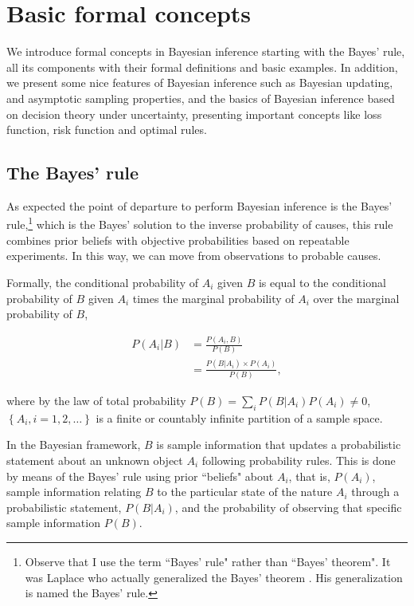 \chapter{Basic formal concepts}\label{chap1}

We introduce formal concepts in Bayesian inference starting with the Bayes’ rule, all its components with their formal definitions and basic examples. In addition, we present some nice features of Bayesian inference such as Bayesian updating, and asymptotic sampling properties, and the basics of Bayesian inference based on decision theory under uncertainty, presenting important concepts like loss function, risk function and optimal rules.

\section{The Bayes' rule}\label{sec11}
As expected the point of departure to perform Bayesian inference is the Bayes' rule,\footnote{Observe that I use the term ``Bayes' rule" rather than ``Bayes' theorem". It was Laplace \cite{laplace1774memoire} who actually generalized the Bayes' theorem \cite{bayes1763lii}. His generalization is named the Bayes' rule.} which is the Bayes' solution to the inverse probability of causes, this rule combines prior beliefs with objective probabilities based on repeatable experiments. In this way, we can move from observations to probable causes. 

Formally, the conditional probability of $A_i$ given $B$ is equal to the conditional probability of $B$ given $A_i$ times the marginal probability of $A_i$ over the marginal probability of $B$,

\begin{align}
	P(A_i|B)&=\frac{P(A_i,B)}{P(B)}\nonumber\\
	&=\frac{P(B|A_i) \times P(A_i)}{P(B)},
	\label{eq:111}
\end{align}

where by the law of total probability $P(B)=\sum_i P(B|A_i)P(A_i)\neq 0$, $\left\{A_i, i=1,2,\dots\right\}$ is a finite or countably infinite partition of a sample space.

In the Bayesian framework, $B$ is sample information that updates a probabilistic statement about an unknown object $A_i$ following probability rules. This is done by means of the Bayes' rule using prior ``beliefs" about $A_i$, that is, $P(A_i)$, sample information relating $B$ to the particular state of the nature $A_i$ through a probabilistic statement, $P(B|A_i)$, and the probability of observing that specific sample information $P(B)$.  

